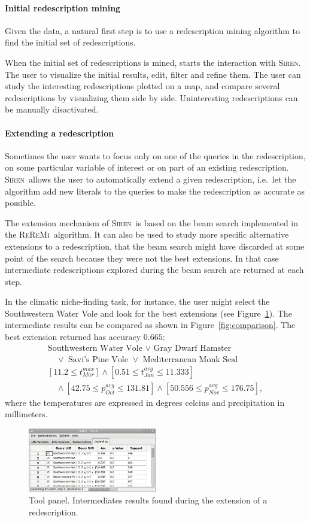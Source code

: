 \documentclass{sig-alternate}
\newcommand{\prg}[1]{\paragraph{#1}}
\newcommand{\Siren}{\textsc{Siren}}
\newcommand{\ReReMi}{\textsc{ReReMi}}
\begin{document}
\prg{Initial redescription mining}
Given the data, a natural first step is to use a redescription mining
algorithm to find the initial set of redescriptions. 

When the initial set of redescriptions is mined, starts the
interaction with \Siren.  The user to visualize the initial results,
edit, filter and refine them.  The user can study the interesting
redescriptions plotted on a map, and compare several redescriptions by
visualizing them side by side. Uninteresting redescriptions can be
manually disactivated.
 
\prg{Extending a redescription} 
Sometimes the user wants to focus only on one of the queries in the
redescription, on some particular variable of interest or on part of
an existing redescription.  \Siren\ allows the user to automatically
extend a given redescription, i.e.\ let the algorithm add new literals
to the queries to make the redescription as accurate as possible.

The extension mechanism of \Siren\ is based on the beam search
implemented in the \ReReMi\ algorithm.  It can also be used to study
more specific alternative extensions to a redescription, that the beam
search might have discarded at some point of the search because they
were not the best extensions. In that case intermediate redescriptions
explored during the beam search are returned at each step.

In the climatic niche-finding task, for instance, the user might select the Southwestern Water Vole and look for the best extensions (see Figure~\ref{fig:extending}). The intermediate results can be compared as shown in Figure~\ref{fig:comparison}. The best extension returned has accuracy $0.665$:
\begin{equation*}
\begin{array}{l}
\text{Southwestern Water Vole }\lor\text{ Gray Dwarf Hamster }\\[1mm]
\quad\lor\text{ Savi's Pine Vole }\lor\text{ Mediterranean Monk Seal}\\[3mm]
[11.2 \leq t_{Mar}^{max}] \land  [0.51 \leq t_{Jan}^{avg} \leq 11.333]\\[1mm]
\quad\land  [42.75 \leq p_{Oct}^{avg} \leq 131.81] \land [50.556 \leq p_{Nov}^{avg} \leq 176.75],
\end{array}
\end{equation*}
where the temperatures are expressed in degrees celcius and precipitation in millimeters.

\begin{figure}
  \centering
\includegraphics[width=0.5\textwidth]{screenshots/extending.png}
  \caption{Tool panel. Intermediates results found during the extension of a redescription.}
  \label{fig:extending}
\end{figure}
\end{document}
